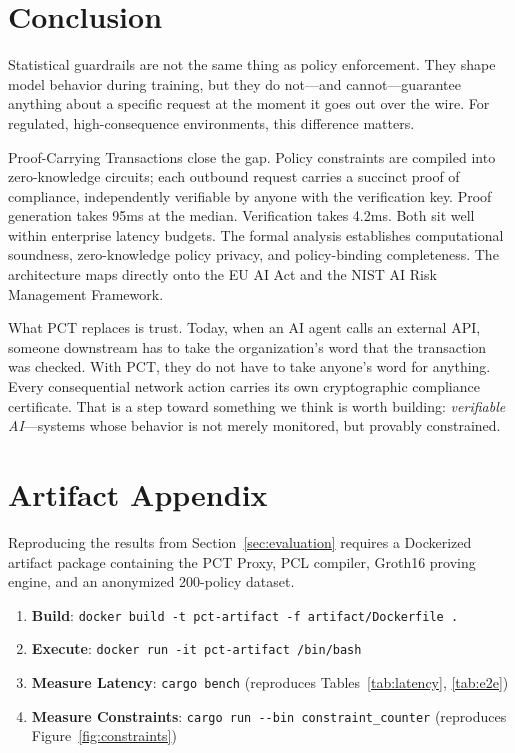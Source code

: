 \documentclass[10pt,conference]{IEEEtran}
\begin{document}
\section{Conclusion}
\label{sec:conclusion}

Statistical guardrails are not the same thing as policy enforcement. They shape model behavior during training, but they do not---and cannot---guarantee anything about a specific request at the moment it goes out over the wire. For regulated, high-consequence environments, this difference matters.

Proof-Carrying Transactions close the gap. Policy constraints are compiled into zero-knowledge circuits; each outbound request carries a succinct proof of compliance, independently verifiable by anyone with the verification key. Proof generation takes 95ms at the median. Verification takes 4.2ms. Both sit well within enterprise latency budgets. The formal analysis establishes computational soundness, zero-knowledge policy privacy, and policy-binding completeness. The architecture maps directly onto the EU AI Act and the NIST AI Risk Management Framework.

What PCT replaces is trust. Today, when an AI agent calls an external API, someone downstream has to take the organization's word that the transaction was checked. With PCT, they do not have to take anyone's word for anything. Every consequential network action carries its own cryptographic compliance certificate. That is a step toward something we think is worth building: \emph{verifiable AI}---systems whose behavior is not merely monitored, but provably constrained.


\appendices

\section{Artifact Appendix}
\label{sec:artifact}

Reproducing the results from Section~\ref{sec:evaluation} requires a Dockerized artifact package containing the PCT Proxy, PCL compiler, Groth16 proving engine, and an anonymized 200-policy dataset.

\begin{enumerate}
    \item \textbf{Build}: \texttt{docker build -t pct-artifact -f artifact/Dockerfile .}
    \item \textbf{Execute}: \texttt{docker run -it pct-artifact /bin/bash}
    \item \textbf{Measure Latency}: \texttt{cargo bench} (reproduces Tables~\ref{tab:latency}, \ref{tab:e2e})
    \item \textbf{Measure Constraints}: \texttt{cargo run {-}{-}bin constraint\_counter} (reproduces Figure~\ref{fig:constraints})
\end{enumerate}
\end{document}
